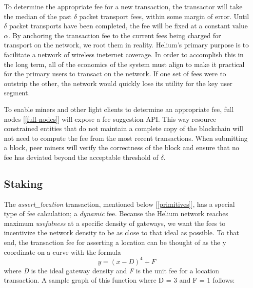 \documentclass[letterpaper,11pt]{article}
\begin{document}
To determine the appropriate fee for a new transaction, the transactor will take the median of the past $\delta$ packet transport fees, within some margin of error. Until $\delta$ packet transports have been completed, the fee will be fixed at a constant value $\alpha$. By anchoring the transaction fee to the current fees being charged for transport on the network, we root them in reality. Helium's primary purpose is to facilitate a network of wireless ineternet coverage. In order to accomplish this in the long term, all of the economics of the system must align to make it practical for the primary users to transact on the network. If one set of fees were to outstrip the other, the network would quickly lose its utility for the key user segment.

To enable miners and other light clients to determine an appropriate fee, full nodes [\ref{full-nodes}] will expose a fee suggestion API. This way resource constrained entities that do not maintain a complete copy of the blockchain will not need to compute the fee from the most recent transactions. When submitting a block, peer miners will verify the correctness of the block and ensure that no fee has deviated beyond the acceptable threshold of $\delta$.

\subsection{Staking} \label{staking}

The \emph{assert\_location} transaction, mentioned below [\ref{primitives}], has a special type of fee calculation; a \emph{dynamic} fee. Because the Helium network reaches maximum \emph{usefulness} at a specific density of gateways, we want the fees to incentivize the network density to be as close to that ideal as possible. To that end, the transaction fee for asserting a location can be thought of as the y coordinate on a curve with the formula \[\mathit{y = \left(x - D\right)^4 + F}\] where \emph{D} is the ideal gateway density and \emph{F} is the unit fee for a location transaction. A sample graph of this function where D = 3 and F = 1 follows:

\pgfplotsset{width=12cm,compat=1.9}
\end{document}
